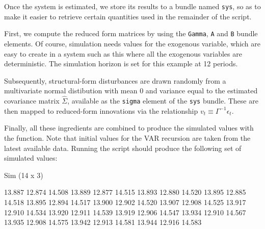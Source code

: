 Once the system is estimated, we store its results to a bundle named
\texttt{sys}, so as to make it easier to retrieve certain quantities
used in the remainder of the script.

First, we compute the reduced form matrices by using the \texttt{Gamma},
\texttt{A} and \texttt{B} bundle elements. Of course, simulation needs
values for the exogenous variable, which are easy to create in a
system such as this where all the exogenous variables are
deterministic. The simulation horizon is set for this example at 12 periods.

Subsequently, structural-form disturbances are drawn randomly from a
multivariate normal distibution with mean 0 and variance equal to the
estimated covariance matrix $\hat{\Sigma}$, available as the
\texttt{sigma} element of the \texttt{sys} bundle. These are
then mapped to reduced-form innovations via the relationship
$v_t \equiv \Gamma^{-1}\epsilon_t$.

Finally, all these ingredients are combined to produce the simulated
values with the  function. Note that initial values for
the VAR recursion are taken from the latest available data. Running
the script should produce the following set of simulated values:

\begin{code}
Sim (14 x 3)

      13.887       12.874       14.508 
      13.889       12.877       14.515 
      13.893       12.880       14.520 
      13.895       12.885       14.518 
      13.895       12.894       14.517 
      13.900       12.902       14.520 
      13.907       12.908       14.525 
      13.917       12.910       14.534 
      13.920       12.911       14.539 
      13.919       12.906       14.547 
      13.934       12.910       14.567 
      13.935       12.908       14.575 
      13.942       12.913       14.581 
      13.944       12.916       14.583 
\end{code}


